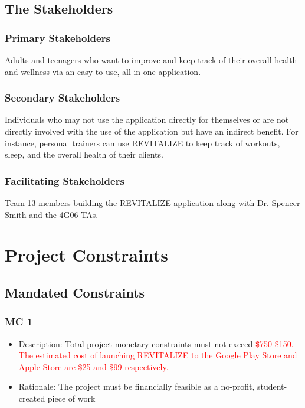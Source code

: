 \documentclass[12pt,letterpaper]{article}
\begin{document}
\subsection{The Stakeholders}

\subsubsection{Primary Stakeholders}
Adults and teenagers who want to improve and keep track of their overall health and wellness via an easy to use, all in one application.

\subsubsection{Secondary Stakeholders}
Individuals who may not use the application directly for themselves or are not directly involved with the use of the application but have an indirect benefit. For instance, personal trainers can use REVITALIZE to keep track of workouts, sleep, and the overall health of their clients.

\subsubsection{Facilitating Stakeholders}
Team 13 members building the REVITALIZE application along with Dr. Spencer Smith and the 4G06 TAs.

\section{Project Constraints}
\subsection{Mandated Constraints}
\subsubsection{MC 1}
\begin{itemize}
	\item Description: Total project monetary constraints must not exceed \textcolor{red}{\sout{\$750 }}{\textcolor{red}{ \$150. The estimated cost of launching REVITALIZE to the Google Play Store and Apple Store are \$25 and \$99 respectively.}}
	\item Rationale: The project must be financially feasible as a no-profit, student-created piece of work
\end{itemize}
\end{document}
